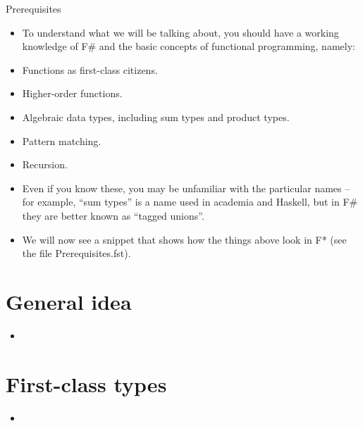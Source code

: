 \documentclass{beamer}
\begin{document}

\begin{frame}{Prerequisites}
\begin{itemize}
	\item To understand what we will be talking about, you should have a working knowledge of F\# and the basic concepts of functional programming, namely:
	\item Functions as first-class citizens.
	\item Higher-order functions.
	\item Algebraic data types, including sum types and product types.
	\item Pattern matching.
	\item Recursion.
	\item Even if you know these, you may be unfamiliar with the particular names -- for example, ``sum types'' is a name used in academia and Haskell, but in F\# they are better known as ``tagged unions''.
	\item We will now see a snippet that shows how the things above look in F* (see the file Prerequisites.fst).
\end{itemize}
\end{frame}

\section{General idea}

\begin{frame}{}
	\begin{itemize}
		\item 
	\end{itemize}
	\end{frame}

\section{First-class types}

\begin{frame}{}
\begin{itemize}
	\item 
\end{itemize}
\end{frame}
\end{document}
